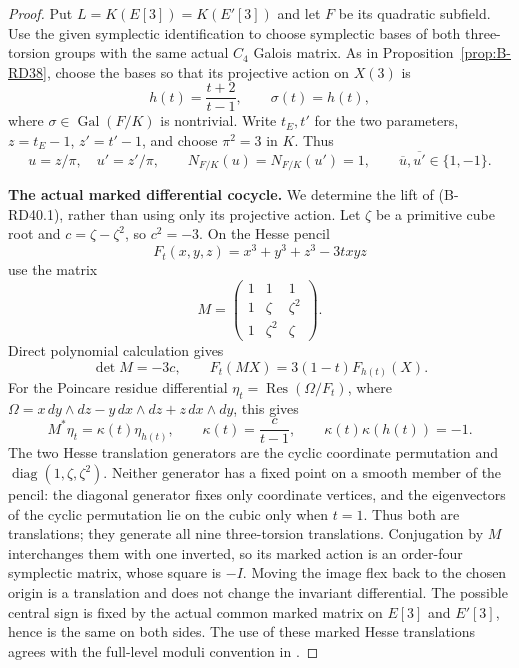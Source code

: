\begin{proof}
Put $L=K(E[3])=K(E'[3])$ and let $F$ be its quadratic subfield.
Use the given symplectic identification to choose symplectic bases of
both three-torsion groups with the same actual $C_4$ Galois matrix.
As in Proposition~\ref{prop:B-RD38}, choose the bases so that its
projective action on $X(3)$ is
\[
 h(t)=\frac{t+2}{t-1},\qquad \sigma(t)=h(t),
                                                        \tag{B-RD40.1}
\]
where $\sigma\in\operatorname{Gal}(F/K)$ is nontrivial.
Write $t_E,t'$ for the two parameters, $z=t_E-1$, $z'=t'-1$,
and choose $\pi^2=3$ in $K$. Thus
\[
 u=z/\pi,\quad u'=z'/\pi,\qquad
 N_{F/K}(u)=N_{F/K}(u')=1,\qquad
 \overline u,\overline{u'}\in\{1,-1\}.
                                                        \tag{B-RD40.2}
\]

\par\smallskip\noindent\textbf{The actual marked differential cocycle.}
We determine the lift of (B-RD40.1), rather than using only its
projective action. Let $\zeta$ be a primitive cube root and
$c=\zeta-\zeta^2$, so $c^2=-3$. On the Hesse pencil
\[
 F_t(x,y,z)=x^3+y^3+z^3-3txyz
\]
use the matrix
\[
 M=\begin{pmatrix}1&1&1\\1&\zeta&\zeta^2\\
                         1&\zeta^2&\zeta\end{pmatrix}.
\]
Direct polynomial calculation gives
\[
 \det M=-3c,\qquad
 F_t(MX)=3(1-t)F_{h(t)}(X).
                                                        \tag{B-RD40.3}
\]
For the Poincare residue differential
$\eta_t=\operatorname{Res}(\Omega/F_t)$, where
$\Omega=x\,dy\wedge dz-y\,dx\wedge dz+z\,dx\wedge dy$, this gives
\[
                  M^*\eta_t=\kappa(t)\eta_{h(t)},
        \qquad    \kappa(t)=\frac c{t-1},
        \qquad    \kappa(t)\kappa(h(t))=-1.
                                                        \tag{B-RD40.4}
\]
The two Hesse translation generators are the cyclic coordinate
permutation and $\operatorname{diag}(1,\zeta,\zeta^2)$.
Neither generator has a fixed point on a smooth member of the
pencil: the diagonal generator fixes only coordinate vertices, and
the eigenvectors of the cyclic permutation lie on the cubic only
when $t=1$. Thus both are translations; they generate all nine
three-torsion translations. Conjugation by $M$ interchanges them
with one inverted, so its marked action is an order-four symplectic matrix, whose square is
$-I$. Moving the image flex back to the chosen origin is a
translation and does not change the invariant differential.
The possible central sign is fixed by the actual common marked
matrix on $E[3]$ and $E'[3]$, hence is the same on both sides.
The use of these marked Hesse translations agrees with the full-level
moduli convention in \citet[Section~2, pp.~4--5]{Fisher2015Nine}.


\end{proof}
